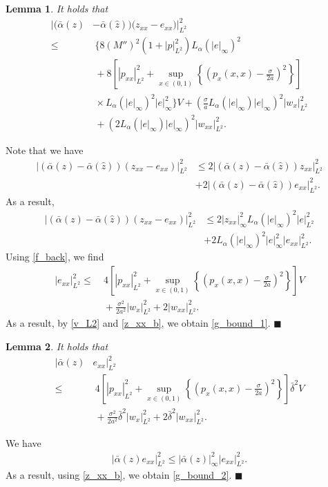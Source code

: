 \documentclass[twocolumn]{autart}
\newtheorem{lemm}{Lemma}
\newenvironment{lemma}{\begin{lemm}}{\hfill \end{lemm}}
\newenvironment{proof}{{\it Proof. }}{\hfill $\blacksquare$ }
\begin{document}
\begin{lemma}
It holds that 
\begin{align}
|\big(\bar{\alpha}(z)&-\bar{\alpha}(\hat{z})\big)\big(z_{xx}-e_{xx}\big)|_{L^2}^2 \nonumber \\
\leq&~ \bigg\{ 8(M'')^2\left(1+|p|_{L^2}^2\right)L_{\alpha}(|e|_{\infty})^2 \nonumber \\
&~+8\left[|p_{xx}|_{L^2}^2+\sup_{x\in (0,1)}\left\{\left( p_x(x,x)-\frac{\sigma}{2a}\right)^2\right\} \right] \nonumber \\
&~\times L_{\alpha}(|e|_{\infty})^2|e|_{\infty}^2\bigg\}V+\left(\frac{\sigma}{a}L_{\alpha}(|e|_{\infty})|e|_{\infty}\right)^2|w_x|_{L^2}^2 \nonumber \\
&~+\left(2L_{\alpha}(|e|_{\infty})|e|_{\infty}\right)^2|w_{xx}|_{L^2}^2. \label{g_bound_1}
\end{align}
\hfill  
\end{lemma}
\begin{proof}
Note that we have 
\begin{align*}
|\left(\bar{\alpha}(z)-\bar{\alpha}(\hat{z})\right)\left(z_{xx}-e_{xx}\right)|_{L^2}^2& \leq 2|\left(\bar{\alpha}(z)-\bar{\alpha}(\hat{z})\right)z_{xx}|_{L^2}^2 \\
&+2|\left(\bar{\alpha}(z)-\bar{\alpha}(\hat{z})\right)e_{xx}|_{L^2}^2. 
\end{align*}
As a result, 
\begin{align*}
|\left(\bar{\alpha}(z)-\bar{\alpha}(\hat{z})\right)\left(z_{xx}-e_{xx}\right)|_{L^2}^2& \leq 2|z_{xx}|_{\infty}^2L_{\alpha}(|e|_{\infty})^2|e|_{L^2}^2 \\
&+2L_{\alpha}(|e|_{\infty})^2|e|_{\infty}^2|e_{xx}|_{L^2}^2. 
\end{align*}
Using \eqref{f_back}, we find
\begin{align}
|e_{xx}|_{L^2}^2 \leq&~ 4 \left[|p_{xx}|_{L^2}^2+\sup_{x\in (0,1)}\left\{\left( p_x(x,x)-\frac{\sigma}{2a}\right)^2\right\} \right]V \nonumber \\
&~+\frac{\sigma^2}{2a^2}|w_x|_{L^2}^2+2|w_{xx}|_{L^2}^2. \label{z_xx_b}
\end{align}
As a result, by \eqref{v_L2} and \eqref{z_xx_b}, we obtain \eqref{g_bound_1}. 
\end{proof}

\begin{lemma}
It holds that 
\begin{align}
|\bar{\alpha}(z)&e_{xx}|_{L^2}^2\nonumber \\
\leq&~4 \left[|p_{xx}|_{L^2}^2+\sup_{x\in (0,1)}\left\{\left( p_x(x,x)-\frac{\sigma}{2a}\right)^2\right\} \right] \bar{\delta}^2V \nonumber \\
&~+\frac{\sigma^2}{2a^2}\bar{\delta}^2|w_x|_{L^2}^2+2\bar{\delta}^2|w_{xx}|_{L^2}^2.\label{g_bound_2}
\end{align}
\hfill  
\end{lemma}
\begin{proof}
We have 
\begin{align*}
|\bar{\alpha}(z)e_{xx}|_{L^2}^2\leq |\bar{\alpha}(z)|_{\infty}^2|e_{xx}|_{L^2}^2.
\end{align*}
As a result, using \eqref{z_xx_b}, we obtain \eqref{g_bound_2}.
\end{proof}
\end{document}
